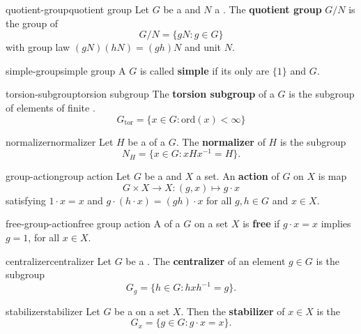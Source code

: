 \begin{topic}{quotient-group}{quotient group}
    Let $G$ be a  and $N$ a . The \textbf{quotient group} $G/N$ is the group of 
    \[ G/N = \{ gN : g \in G \} \]
    with group law $(gN)(hN) = (gh)N$ and unit $N$.
\end{topic}

\begin{topic}{simple-group}{simple group}
    A  $G$ is called \textbf{simple} if its only  are $\{ 1 \}$ and $G$.
\end{topic}

\begin{topic}{torsion-subgroup}{torsion subgroup}
    The \textbf{torsion subgroup} of a  $G$ is the subgroup of elements of finite .
    \[ G_{\text{tor}} = \{ x \in G : \text{ord}(x) < \infty \} \]
\end{topic}

\begin{topic}{normalizer}{normalizer}
    Let $H$ be a  of a  $G$. The \textbf{normalizer} of $H$ is the subgroup
    \[ N_H = \{ x \in G : x H x^{-1} = H \} . \]
\end{topic}

\begin{topic}{group-action}{group action}
    Let $G$ be a  and $X$ a set. An \textbf{action} of $G$ on $X$ is map
    \[ G \times X \to X : (g, x) \mapsto g \cdot x \]
    satisfying $1 \cdot x = x$ and $g \cdot (h \cdot x) = (gh) \cdot x$ for all $g, h \in G$ and $x \in X$.
\end{topic}

\begin{topic}{free-group-action}{free group action}
    A  of a  $G$ on a set $X$ is \textbf{free} if $g \cdot x = x$ implies $g = 1$, for all $x \in X$.
\end{topic}

\begin{topic}{centralizer}{centralizer}
    Let $G$ be a . The \textbf{centralizer} of an element $g \in G$ is the subgroup
    \[ G_g = \{ h \in G : h x h^{-1} = g \} . \]
\end{topic}

\begin{topic}{stabilizer}{stabilizer}
    Let $G$ be a   on a set $X$. Then the \textbf{stabilizer} of $x \in X$ is the 
    \[ G_x = \{ g \in G : g \cdot x = x \} . \]
\end{topic}

